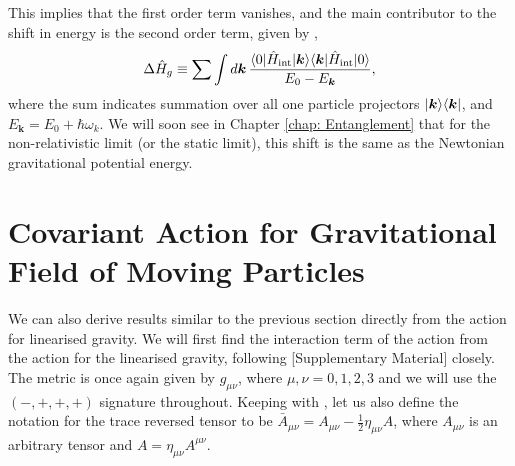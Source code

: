 \documentclass[12pt,a4paper]{report}
\theoremstyle{plain}
\theoremstyle{definition}
\theoremstyle{remark}
\newcommand{\mink}{\eta_{\mu\nu}}
\newcommand{\munu}{\mu\nu}
\newcommand{\Hint}{\hat{H}_{\text{int}}}
\DeclarePairedDelimiter\bra{\langle}{\rvert}
\DeclarePairedDelimiter\ket{\lvert}{\rangle}
\begin{document}
This implies that the first order term vanishes, and the main contributor to the shift in energy is the second order term, given by \cite{Bose_2022},
\begin{equation}
    \Delta \hat{H}_{g} \equiv \sum \int d\bm{k} \,\frac{\bra{0}\Hint\ket{\bm{k}}\bra{\bm{k}}\Hint\ket{0}}{E_0 - E_{\bm{k}}},
    \label{eq: GenShiftHg}
\end{equation}
where the sum indicates summation over all one particle projectors $\ket{\bm{k}}\bra{\bm{k}}$, and $E_{\bm{k}} = E_0 + \hbar\omega_k$. We will soon see in Chapter \ref{chap: Entanglement} that for the non-relativistic limit (or the static limit), this shift is the same as the Newtonian gravitational potential energy.

\section{Covariant Action for Gravitational Field of Moving Particles}
We can also derive results similar to the previous section directly from the action for linearised gravity. We will first find the interaction term of the action from the action for the linearised gravity, following \citet{Christodoulou_2023b}[Supplementary Material] closely. The metric is once again given by $g_{\munu}$, where $\mu, \nu = 0, 1, 2, 3$ and we will use the $(-, +, +, +)$ signature throughout. Keeping with \citet{Christodoulou_2023b}, let us also define the notation for the trace reversed tensor to be $\bar{A}_{\munu} = A_{\munu} - \frac{1}{2}\mink A$, where $A_{\munu}$ is an arbitrary tensor and $A = \mink A^{\munu}$.
\end{document}
